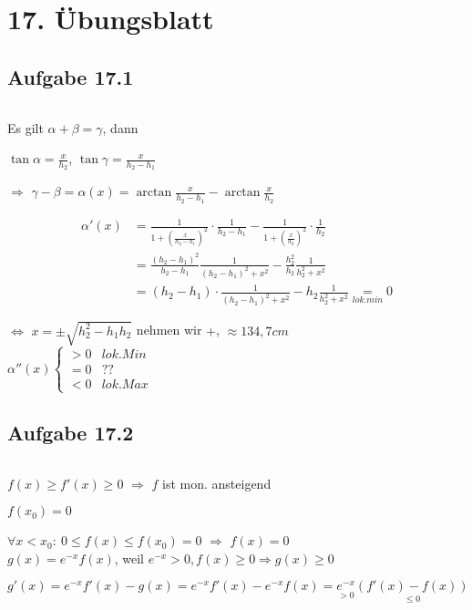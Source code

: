 \section{17. Übungsblatt}

\subsection{Aufgabe 17.1}
$ $\newline

Es gilt $\alpha+\beta=\gamma$, dann

$\tan\alpha=\frac{x}{h_2}$, $\tan\gamma=\frac{x}{h_2-h_1}$

$\Rightarrow$ $\gamma-\beta=\alpha(x)=\arctan\frac{x}{h_2-h_1}-\arctan\frac{x}{h_2}$

\begin{align*}
\alpha'(x)&=\frac{1}{1+(\frac{x}{h_2-h_1})^2}\cdot\frac{1}{h_2-h_1}-\frac{1}{1+(\frac{x}{h_2})^2}\cdot\frac{1}{h_2}\\
&=\frac{(h_2-h_1)^2}{h_2-h_1}\frac{1}{(h_2-h_1)^2+x^2}-\frac{h_2^2}{h_2}\frac{1}{h_2^2+x^2}\\
&=(h_2-h_1)\cdot\frac{1}{(h_2-h_1)^2+x^2}-h_2\frac{1}{h_2^2+x^2}\underset{lok.min}{=}0
\end{align*}

$\Leftrightarrow$ $x=\pm\sqrt{h_2^2-h_1h_2}$ nehmen wir $+$, $\approx134,7cm$\\

$\alpha''(x)
\left\{
\begin{array}{rcl}
>0 & lok.Min\\
=0 & ??\\
<0 & lok.Max 
\end{array}
\right.$

\subsection{Aufgabe 17.2}
$ $\newline

$f(x)\geq f'(x)\geq 0$ $\Rightarrow$ $f$ ist mon. ansteigend

$f(x_0)=0$

$\forall x<x_0:\ 0\leq f(x)\leq f(x_0)=0$ $\Rightarrow$ $f(x)=0$\\

$g(x)=e^{-x}f(x)$, weil $e^{-x}>0,f(x)\geq0\Rightarrow g(x)\geq0$

\begin{equation*}
g'(x)=e^{-x}f'(x)-g(x)=e^{-x}f'(x)-e^{-x}f(x)=\underset{>0}{e^{-x}}\underset{\leq0}{(f'(x)-f(x))}
\end{equation*}


